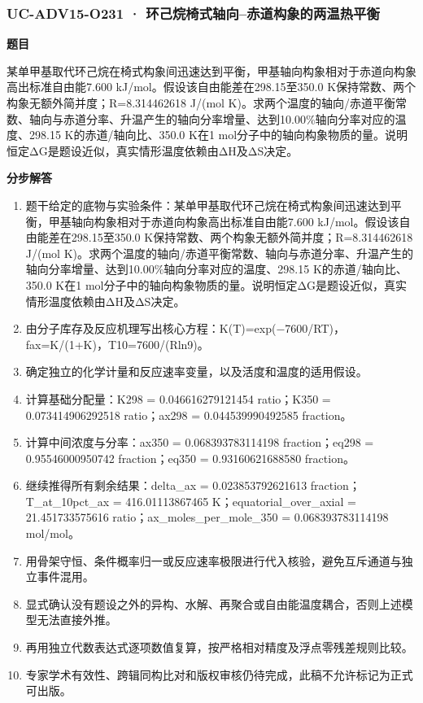 \documentclass[UTF8,11pt,a4paper]{ctexart}
\begin{document}
\subsubsection*{UC-ADV15-O231 · 环己烷椅式轴向–赤道构象的两温热平衡}
\noindent\textbf{题目}\par
某单甲基取代环己烷在椅式构象间迅速达到平衡，甲基轴向构象相对于赤道向构象高出标准自由能7.600 kJ/mol。假设该自由能差在298.15至350.0 K保持常数、两个构象无额外简并度；R=8.314462618 J/(mol K)。求两个温度的轴向/赤道平衡常数、轴向与赤道分率、升温产生的轴向分率增量、达到10.00\%轴向分率对应的温度、298.15 K的赤道/轴向比、350.0 K在1 mol分子中的轴向构象物质的量。说明恒定ΔG是题设近似，真实情形温度依赖由ΔH及ΔS决定。\par
\medskip\noindent\textbf{分步解答}
\begin{enumerate}
\item 题干给定的底物与实验条件：某单甲基取代环己烷在椅式构象间迅速达到平衡，甲基轴向构象相对于赤道向构象高出标准自由能7.600 kJ/mol。假设该自由能差在298.15至350.0 K保持常数、两个构象无额外简并度；R=8.314462618 J/(mol K)。求两个温度的轴向/赤道平衡常数、轴向与赤道分率、升温产生的轴向分率增量、达到10.00\%轴向分率对应的温度、298.15 K的赤道/轴向比、350.0 K在1 mol分子中的轴向构象物质的量。说明恒定ΔG是题设近似，真实情形温度依赖由ΔH及ΔS决定。
\item 由分子库存及反应机理写出核心方程：K(T)=exp(−7600/RT)，fax=K/(1+K)，T10=7600/(Rln9)。
\item 确定独立的化学计量和反应速率变量，以及活度和温度的适用假设。
\item 计算基础分配量：K298 = 0.046616279121454 ratio；K350 = 0.073414906292518 ratio；ax298 = 0.044539990492585 fraction。
\item 计算中间浓度与分率：ax350 = 0.068393783114198 fraction；eq298 = 0.95546000950742 fraction；eq350 = 0.93160621688580 fraction。
\item 继续推得所有剩余结果：delta\_ax = 0.023853792621613 fraction；T\_at\_10pct\_ax = 416.01113867465 K；equatorial\_over\_axial = 21.451733575616 ratio；ax\_moles\_per\_mole\_350 = 0.068393783114198 mol/mol。
\item 用骨架守恒、条件概率归一或反应速率极限进行代入核验，避免互斥通道与独立事件混用。
\item 显式确认没有题设之外的异构、水解、再聚合或自由能温度耦合，否则上述模型无法直接外推。
\item 再用独立代数表达式逐项数值复算，按严格相对精度及浮点零残差规则比较。
\item 专家学术有效性、跨辑同构比对和版权审核仍待完成，此稿不允许标记为正式可出版。
\end{enumerate}
\end{document}
